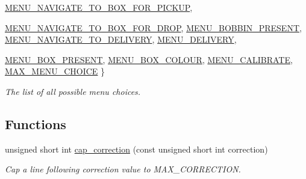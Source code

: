 \begin{DoxyCompactItemize}
\hyperlink{namespaceIDP_ac1d3c3b62448912be4da9f2728f2af99af9cbb35cc3ca99c19edbf7918287ff12}{MENU\_\-NAVIGATE\_\-TO\_\-BOX\_\-FOR\_\-PICKUP}, 
\par
\hyperlink{namespaceIDP_ac1d3c3b62448912be4da9f2728f2af99ab4bf7000587f9abb5d369dccbd5ae73e}{MENU\_\-NAVIGATE\_\-TO\_\-BOX\_\-FOR\_\-DROP}, 
\hyperlink{namespaceIDP_ac1d3c3b62448912be4da9f2728f2af99a07b420112886818adfaa606881ecc79a}{MENU\_\-BOBBIN\_\-PRESENT}, 
\hyperlink{namespaceIDP_ac1d3c3b62448912be4da9f2728f2af99a4eb6cc58b42d6752a2dd912e209b5beb}{MENU\_\-NAVIGATE\_\-TO\_\-DELIVERY}, 
\hyperlink{namespaceIDP_ac1d3c3b62448912be4da9f2728f2af99a214282dca7a3b28d826953353d51ead6}{MENU\_\-DELIVERY}, 
\par
\hyperlink{namespaceIDP_ac1d3c3b62448912be4da9f2728f2af99aecf2d0dcd0e5b837249a59d55cd9bbde}{MENU\_\-BOX\_\-PRESENT}, 
\hyperlink{namespaceIDP_ac1d3c3b62448912be4da9f2728f2af99a50d558d829ec96bbbc4188d19e49f2a9}{MENU\_\-BOX\_\-COLOUR}, 
\hyperlink{namespaceIDP_ac1d3c3b62448912be4da9f2728f2af99a61501b095eedafec05618df7b904a7d8}{MENU\_\-CALIBRATE}, 
\hyperlink{namespaceIDP_ac1d3c3b62448912be4da9f2728f2af99a01973890c4a02e0650a9043c790228fd}{MAX\_\-MENU\_\-CHOICE}
 \}
\begin{DoxyCompactList}\small\item\em The list of all possible menu choices. \item\end{DoxyCompactList}\end{DoxyCompactItemize}
\subsection*{Functions}
\begin{DoxyCompactItemize}
\item 
unsigned short int \hyperlink{namespaceIDP_ae66b1b69bcde3ba7995f2fd46c6f21f5}{cap\_\-correction} (const unsigned short int correction)
\begin{DoxyCompactList}\small\item\em Cap a line following correction value to MAX\_\-CORRECTION. \item\end{DoxyCompactList}\end{DoxyCompactItemize}
